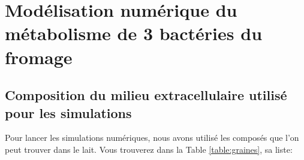 \documentclass[../main.tex]{subfiles}
\begin{document}
\appendix
\chapter*{Modélisation numérique du métabolisme de 3 bactéries du fromage}

\section*{Composition du milieu extracellulaire utilisé pour les simulations}

Pour lancer les simulations numériques, nous avons utilisé les composés que l'on peut trouver dans le lait. Vous trouverez dans la Table \ref{table:graines}, sa liste:
\end{document}
